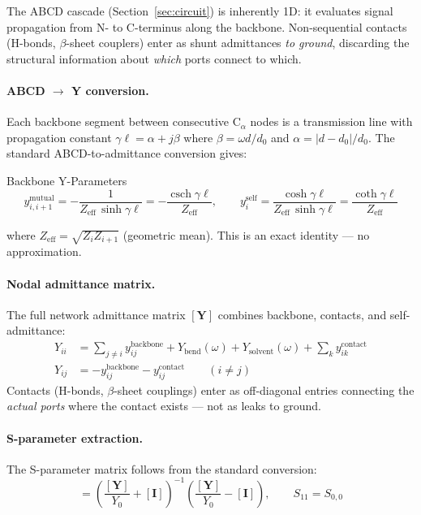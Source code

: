The ABCD cascade (Section~\ref{sec:circuit}) is inherently 1D: it
evaluates signal propagation from N- to C-terminus along the backbone.
Non-sequential contacts (H-bonds, $\beta$-sheet couplers) enter as
shunt admittances \emph{to ground}, discarding the structural information
about \emph{which} ports connect to which.

\paragraph{ABCD $\to$ Y conversion.}
Each backbone segment between consecutive C$_\alpha$ nodes is a
transmission line with propagation constant $\gamma\ell = \alpha + j\beta$
where $\beta = \omega d / d_0$ and $\alpha = |d - d_0|/d_0$.  The
standard ABCD-to-admittance conversion gives:
\begin{resultbox}{Backbone Y-Parameters}
\begin{equation}
    y^\text{mutual}_{i,i+1} = -\frac{1}{Z_\text{eff}\,\sinh\gamma\ell}
    = -\frac{\operatorname{csch}\gamma\ell}{Z_\text{eff}}, \qquad
    y^\text{self}_{i} = \frac{\cosh\gamma\ell}{Z_\text{eff}\,\sinh\gamma\ell}
    = \frac{\coth\gamma\ell}{Z_\text{eff}}
    \label{eq:abcd_to_y}
\end{equation}
\end{resultbox}
\noindent where $Z_\text{eff} = \sqrt{Z_i Z_{i+1}}$ (geometric mean).
This is an exact identity --- no approximation.

\paragraph{Nodal admittance matrix.}
The full network admittance matrix $[\mathbf{Y}]$ combines backbone,
contacts, and self-admittance:
\begin{align}
    Y_{ii} &= \sum_{j\neq i} y_{ij}^\text{backbone}
            + Y_\text{bend}(\omega) + Y_\text{solvent}(\omega)
            + \sum_k y_{ik}^\text{contact}
    \\
    Y_{ij} &= -y_{ij}^\text{backbone} - y_{ij}^\text{contact}
    \qquad (i \neq j)
\end{align}
Contacts (H-bonds, $\beta$-sheet couplings) enter as off-diagonal
entries connecting the \emph{actual ports} where the contact exists ---
not as leaks to ground.

\paragraph{S-parameter extraction.}
The S-parameter matrix follows from the standard conversion:
\begin{equation}
    [\mathbf{S}] = \left(\frac{[\mathbf{Y}]}{Y_0} + [\mathbf{I}]\right)^{-1}
                 \left(\frac{[\mathbf{Y}]}{Y_0} - [\mathbf{I}]\right),
    \qquad S_{11} = S_{0,0}
    \label{eq:y_to_s}
\end{equation}

